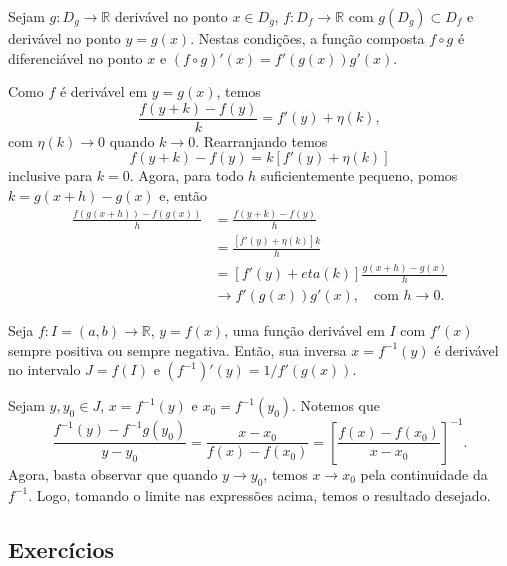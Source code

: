 \begin{teo}
  Sejam $g:D_g\to\mathbb{R}$ derivável no ponto $x\in D_g$, $f:D_f\to\mathbb{R}$ com $g(D_g)\subset D_f$ e derivável no ponto $y=g(x)$. Nestas condições, a função composta $f\circ g$ é diferenciável no ponto $x$ e $(f\circ g)'(x) = f'(g(x))g'(x)$.
\end{teo}
\begin{dem}
  Como $f$ é derivável em $y=g(x)$, temos
  \begin{equation}
    \frac{f(y+k) - f(y)}{k} = f'(y) + \eta(k),
  \end{equation}
com $\eta(k)\to 0$ quando $k\to 0$. Rearranjando temos
\begin{equation}
  f(y+k)-f(y) = k[f'(y) + \eta(k)]
\end{equation}
inclusive para $k=0$. Agora, para todo $h$ suficientemente pequeno, pomos $k = g(x+h) - g(x)$ e, então
\begin{align}
  \frac{f(g(x+h))-f(g(x))}{h} &= \frac{f(y+k)-f(y)}{h}\\
                              &= \frac{[f'(y)+\eta(k)]k}{h}\\
                              &= [f'(y) + eta(k)]\frac{g(x+h)-g(x)}{h}\\
                              &\to f'(g(x))g'(x),\quad\text{com }h\to 0.
\end{align}
\end{dem}

\begin{teo}
  Seja $f:I=(a, b)\to\mathbb{R}$, $y=f(x)$, uma função derivável em $I$ com $f'(x)$ sempre positiva ou sempre negativa. Então, sua inversa $x=f^{-1}(y)$ é derivável no intervalo $J = f(I)$ e $(f^{-1})'(y) = 1/f'(g(x))$.
\end{teo}
\begin{dem}
  Sejam $y,y_0\in J$, $x=f^{-1}(y)$ e $x_0=f^{-1}(y_0)$. Notemos que
  \begin{equation}
    \frac{f^{-1}(y)-f^{-1}g(y_0)}{y-y_0} = \frac{x-x_0}{f(x)-f(x_0)} = \left[\frac{f(x)-f(x_0)}{x-x_0}\right]^{-1}.
  \end{equation}
Agora, basta observar que quando $y\to y_0$, temos $x\to x_0$ pela continuidade da $f^{-1}$. Logo, tomando o limite nas expressões acima, temos o resultado desejado.
\end{dem}

\subsection*{Exercícios}

